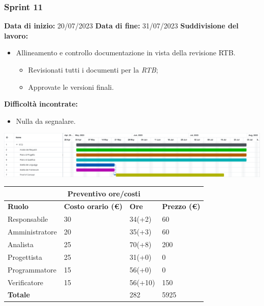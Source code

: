 \documentclass[a4paper, 12pt]{article}
\begin{document}
\subsubsection{Sprint 11}
\textbf{Data di inizio:} 20/07/2023\newline
\textbf{Data di fine:} 31/07/2023\newline
\newline
\textbf{Suddivisione del lavoro:}
\begin{itemize}
	\item Allineamento e controllo documentazione in vista della revisione RTB.
	      \begin{itemize}
		      \item Revisionati tutti i documenti per la \textit{RTB};
		      \item Approvate le versioni finali.
	      \end{itemize}
\end{itemize}
\textbf{Difficoltà incontrate:}
\begin{itemize}
	\item Nulla da segnalare.
\end{itemize}
\includegraphics[scale=0.178]{RTB_10e11.png}\newline
\newline
\begin{center}
	\begin{tabularx}{\textwidth}{|X|X|X|X|}
		\hline
		\multicolumn{4}{|c|}{\textbf{Preventivo ore/costi}}                                      \\
		\hline
		\hline
		\textbf{Ruolo}  & \textbf{Costo orario (\euro)} & \textbf{Ore} & \textbf{Prezzo (\euro)} \\
		\hline
		Responsabile    & 30                            & 34(+2)       & 60                      \\
		\hline
		Amministratore  & 20                            & 35(+3)       & 60                      \\
		\hline
		Analista        & 25                            & 70(+8)       & 200                     \\
		\hline
		Progettista     & 25                            & 31(+0)       & 0                       \\
		\hline
		Programmatore   & 15                            & 56(+0)       & 0                       \\
		\hline
		Verificatore    & 15                            & 56(+10)      & 150                     \\
		\hline
		\hline
		\textbf{Totale} &                               & 282          & 5925                    \\
		\hline
	\end{tabularx}\\[8pt]
	\mbox{}\\
\end{center}
\end{document}
